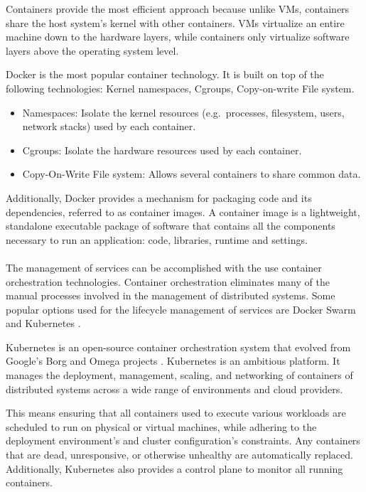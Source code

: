 Containers provide the most efficient approach because unlike VMs, containers share the host system’s kernel with other containers.
VMs virtualize an entire machine down to the hardware layers, while containers only virtualize software layers above the operating system level.

Docker \cite{docker} is the most popular container technology. It is built on top of the following technologies: Kernel namespaces, Cgroups, Copy-on-write File system.
\begin{itemize}
    \item Namespaces: Isolate the kernel resources (e.g.\ processes, filesystem, users, network stacks) used by each container.
    \item Cgroups: Isolate the hardware resources used by each container.
    \item Copy-On-Write File system: Allows several containers to share common data.
\end{itemize}

Additionally, Docker provides a mechanism for packaging code and its dependencies, referred to as container images.
A container image is a lightweight, standalone executable package of software that contains all the components necessary to run an application: code, libraries, runtime and settings.

\paragraph{}

The management of services can be accomplished with the use container orchestration technologies.
Container orchestration eliminates many of the manual processes involved in the management of distributed systems.
Some popular options used for the lifecycle management of services are Docker Swarm \cite{docker2016swarm} and Kubernetes \cite{kubernetes}.

Kubernetes \cite{kubernetes} is an open-source container orchestration system that evolved from Google's Borg and Omega projects \cite{burns2016borg}.
Kubernetes is an ambitious platform. It manages the deployment, management, scaling, and networking of containers of distributed systems across a wide range of environments
and cloud providers.

This means ensuring that all containers used to execute various workloads are scheduled to run on physical or virtual machines,
while adhering to the deployment environment's and cluster configuration's constraints.
Any containers that are dead, unresponsive, or otherwise unhealthy are automatically replaced.
Additionally, Kubernetes also provides a control plane to monitor all running containers.


